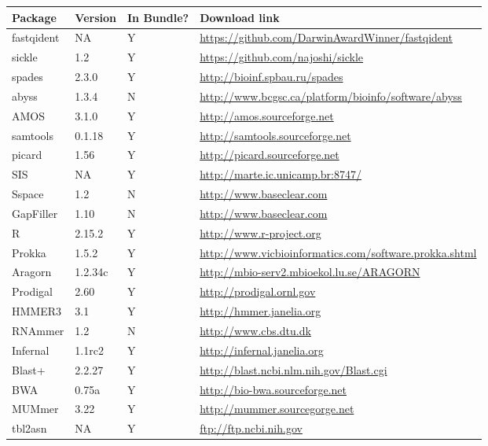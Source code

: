 \documentclass[a4paper,10pt]{article}
\begin{document}
\begin{tabular}{llll}
{\bf Package } & {\bf Version } & { \bf In Bundle? }  & { \bf Download link }\\
\hline
fastqident & NA & Y & \href{https://github.com/DarwinAwardWinner/fastqident}{https://github.com/DarwinAwardWinner/fastqident} \\
sickle  & 1.2 & Y & \href{https://github.com/najoshi/sickle}{https://github.com/najoshi/sickle}  \\
spades & 2.3.0 & Y & \href{http://bioinf.spbau.ru/spades}{http://bioinf.spbau.ru/spades}\\
abyss & 1.3.4 & N & \href{http://www.bcgsc.ca/platform/bioinfo/software/abyss}{http://www.bcgsc.ca/platform/bioinfo/software/abyss}\\
AMOS  & 3.1.0 & Y & \href{http://amos.sourceforge.net}{http://amos.sourceforge.net} \\
samtools &  0.1.18 & Y & \href{http://samtools.sourceforge.net/}{http://samtools.sourceforge.net} \\
picard  & 1.56  & Y &\href{http://picard.sourceforge.net/}{http://picard.sourceforge.net} \\
SIS  & NA & Y & \href{http://marte.ic.unicamp.br:8747/}{http://marte.ic.unicamp.br:8747/} \\
Sspace & 1.2 & N & \href{http://www.baseclear.com/landingpages/basetools-a-wide-range-of-bioinformatics-solutions/sspacev12/}{http://www.baseclear.com} \\
GapFiller & 1.10 & N & \href{http://www.baseclear.com/landingpages/basetools-a-wide-range-of-bioinformatics-solutions/gapfiller/}{http://www.baseclear.com} \\
R & 2.15.2 & Y & \href{http://www.r-project.org}{http://www.r-project.org} \\
Prokka & 1.5.2 & Y & \href{http://www.vicbioinformatics.com/software.prokka.shtml}{http://www.vicbioinformatics.com/software.prokka.shtml} \\
Aragorn & 1.2.34c & Y & \href{http://mbio-serv2.mbioekol.lu.se/ARAGORN/}{http://mbio-serv2.mbioekol.lu.se/ARAGORN} \\
Prodigal & 2.60 & Y & \href{http://prodigal.ornl.gov}{http://prodigal.ornl.gov} \\
HMMER3 & 3.1 & Y & \href{http://hmmer.janelia.org}{http://hmmer.janelia.org} \\
RNAmmer & 1.2 & N & \href{http://www.cbs.dtu.dk/cgi-bin/sw_request?rnammer}{http://www.cbs.dtu.dk} \\
Infernal & 1.1rc2 & Y & \href{http://infernal.janelia.org}{http://infernal.janelia.org} \\
Blast+ & 2.2.27 & Y & \href{http://blast.ncbi.nlm.nih.gov/Blast.cgi?CMD=Web\&PAGE_TYPE=BlastDocs\&DOC_TYPE=Download}{http://blast.ncbi.nlm.nih.gov/Blast.cgi} \\
BWA & 0.75a & Y & \href{http://bio-bwa.sourceforge.net}{http://bio-bwa.sourceforge.net} \\
MUMmer & 3.22 & Y & \href{http://mummer.sourceforge.net/}{http://mummer.sourcegorge.net} \\
tbl2asn & NA & Y & \href{ftp://ftp.ncbi.nih.gov/toolbox/ncbi_tools/converters/by_program/tbl2asn/}{ftp://ftp.ncbi.nih.gov} \\
\end{tabular}
\end{document}

